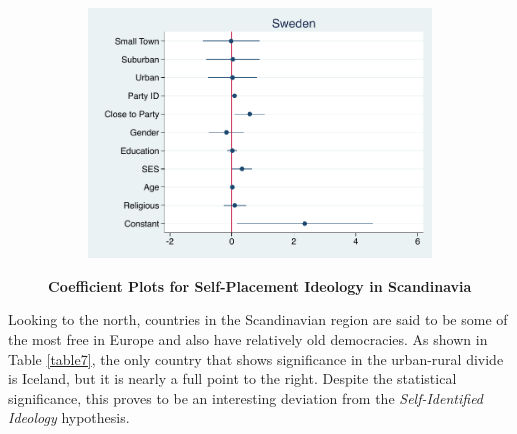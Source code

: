 \documentclass[12pt, titlepage]{article}
\newcommand\e{\emph}
\newcommand\tb{\textbf}
\begin{document}
\begin{figure}[H]
\begin{subfigure}[b]{0.475\textwidth}
		\includegraphics[width=\textwidth]{IdeologyCoef/Sweden}
	\end{subfigure}
	\caption[ \tb{Self-Placement Ideology - Scandinavia} ]
	{\tb {Coefficient Plots for Self-Placement Ideology in Scandinavia} }
	\label{ScandinaviaIdeo}
\end{figure}


Looking to the north, countries in the Scandinavian region are said to be some of the most free in Europe and also have relatively old democracies. As shown in Table \ref{table7}, the only country that shows significance in the urban-rural divide is Iceland, but it is nearly a full point to the right. Despite the statistical significance, this proves to be an interesting deviation from the \e{Self-Identified Ideology} hypothesis.
\end{document}
